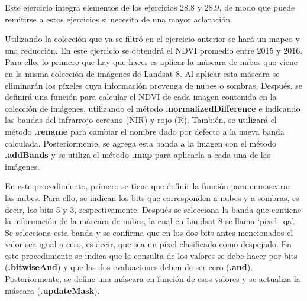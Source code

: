 \documentclass[
  12pt,
  letterpaper,
  twoside]{book}
\newcommand\boldpurple[1]{\textcolor{darkpurple}{\textbf{#1}}}
\begin{document}
Este ejercicio integra elementos de los ejercicios 28.8 y 28.9, de modo que puede remitirse a estos ejercicios si necesita de una mayor aclaración.

Utilizando la colección que ya se filtró en el ejercicio anterior se hará un mapeo y una reducción. En este ejercicio se obtendrá el NDVI promedio entre 2015 y 2016. Para ello, lo primero que hay que hacer es aplicar la máscara de nubes que viene en la misma colección de imágenes de Landsat 8. Al aplicar esta máscara se eliminarán los píxeles cuya información provenga de nubes o sombras. Después, se definirá una función para calcular el NDVI de cada imagen contenida en la colección de imágenes, utilizando el método \boldpurple{.normalizedDifference} e indicando las bandas del infrarrojo cercano (NIR) y rojo (R). También, se utilizará el método \boldpurple{.rename} para cambiar el nombre dado por defecto a la nueva banda calculada. Posteriormente, se agrega esta banda a la imagen con el método \boldpurple{.addBands} y se utiliza el método \boldpurple{.map} para aplicarla a cada una de las imágenes.

En este procedimiento, primero se tiene que definir la función para enmascarar las nubes. Para ello, se indican los bits que corresponden a nubes y a sombras, es decir, los bits 5 y 3, respectivamente. Después se selecciona la banda que contiene la información de la máscara de nubes, la cual en Landsat 8 se llama `pixel\_qa'. Se selecciona esta banda y se confirma que en los dos bits antes mencionados el valor sea igual a cero, es decir, que sea un píxel clasificado como despejado. En este procedimiento se indica que la consulta de los valores se debe hacer por bits (\boldpurple{.bitwiseAnd}) y que las dos evaluaciones deben de ser cero (\boldpurple{.and}). Posteriormente, se define una máscara en función de esos valores y se actualiza la máscara (\boldpurple{.updateMask}).
\end{document}
